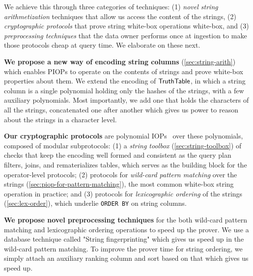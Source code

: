 We achieve this through three categories of techniques: (1) \emph{novel string arithmetization} techniques that allow us access the content of the strings, (2) \emph{cryptographic protocols} that prove string white-box operations white-box, and (3) \emph{preprocessing techniques} that the data owner performs once at ingestion to make those protocols cheap at query time. We elaborate on these next.

\textbf{We propose a new way of encoding string columns} (\cref{sec:string-arith}) which enables PIOPs to operate on the contents of strings and prove white-box properties about them. We extend the encoding of $\mathsf{TruthTable}$, in which a string column is a single polynomial holding only the hashes of the strings, with a few auxiliary polynomials. Most importantly, we add one that holds the characters of all the strings, concatenated one after another which gives us power to reason about the strings in a character level.


\textbf{Our cryptographic protocols}
are polynomial IOPs~\cite{ChiesaHMMVW20,BunzFS20} over these polynomials, composed of modular subprotocols: (1) a \emph{string toolbox} (\cref{sec:string-toolbox}) of checks that keep the encoding well formed and consistent as the query plan filters, joins, and rematerializes tables, which serves as the building block for the operator-level protocols; (2) protocols for \emph{wild-card pattern matching} over the strings (\cref{sec:piop-for-pattern-matching}), the most common white-box string operation in practice; and (3) protocols for \emph{lexicographic ordering} of the strings (\cref{sec:lex-order}), which underlie \texttt{ORDER BY} on string columns.

\textbf{We propose novel preprocessing techniques} for the both wild-card pattern matching and lexicographic ordering operations to speed up the prover. We use a database technique called "String fingerprinting" which gives us \XXX speed up in the wild-card pattern matching. To improve the prover time for string ordering, we simply attach an auxiliary ranking column and sort based on that which gives us \XXX speed up.

